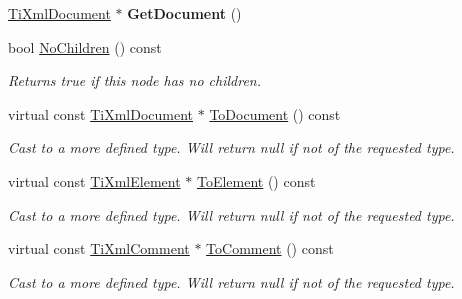 \begin{DoxyCompactItemize}
\hypertarget{class_ti_xml_node_a7b2372c0e7adfb32f5b6902fe49a39b2}{}\label{class_ti_xml_node_a7b2372c0e7adfb32f5b6902fe49a39b2} 
\hyperlink{class_ti_xml_document}{Ti\+Xml\+Document} $\ast$ {\bfseries Get\+Document} ()
\item 
\hypertarget{class_ti_xml_node_abe85e0ec04ea59c033f324c8504653e5}{}\label{class_ti_xml_node_abe85e0ec04ea59c033f324c8504653e5} 
bool \hyperlink{class_ti_xml_node_abe85e0ec04ea59c033f324c8504653e5}{No\+Children} () const
\begin{DoxyCompactList}\small\item\em Returns true if this node has no children. \end{DoxyCompactList}\item 
\hypertarget{class_ti_xml_node_a775a904618cad6e4a8049bda4f5a6aa9}{}\label{class_ti_xml_node_a775a904618cad6e4a8049bda4f5a6aa9} 
virtual const \hyperlink{class_ti_xml_document}{Ti\+Xml\+Document} $\ast$ \hyperlink{class_ti_xml_node_a775a904618cad6e4a8049bda4f5a6aa9}{To\+Document} () const
\begin{DoxyCompactList}\small\item\em Cast to a more defined type. Will return null if not of the requested type. \end{DoxyCompactList}\item 
\hypertarget{class_ti_xml_node_a4080428f2cac46e92ef4d284202fad0b}{}\label{class_ti_xml_node_a4080428f2cac46e92ef4d284202fad0b} 
virtual const \hyperlink{class_ti_xml_element}{Ti\+Xml\+Element} $\ast$ \hyperlink{class_ti_xml_node_a4080428f2cac46e92ef4d284202fad0b}{To\+Element} () const
\begin{DoxyCompactList}\small\item\em Cast to a more defined type. Will return null if not of the requested type. \end{DoxyCompactList}\item 
\hypertarget{class_ti_xml_node_a5ad43b9d545315e9bb4f50d4cb70de9e}{}\label{class_ti_xml_node_a5ad43b9d545315e9bb4f50d4cb70de9e} 
virtual const \hyperlink{class_ti_xml_comment}{Ti\+Xml\+Comment} $\ast$ \hyperlink{class_ti_xml_node_a5ad43b9d545315e9bb4f50d4cb70de9e}{To\+Comment} () const
\begin{DoxyCompactList}\small\item\em Cast to a more defined type. Will return null if not of the requested type. \end{DoxyCompactList}\item 
\hypertarget{class_ti_xml_node_ab4f2e6ce87d36c1b9b7de2529128a460}{}\label{class_ti_xml_node_ab4f2e6ce87d36c1b9b7de2529128a460} 

\end{DoxyCompactItemize}
